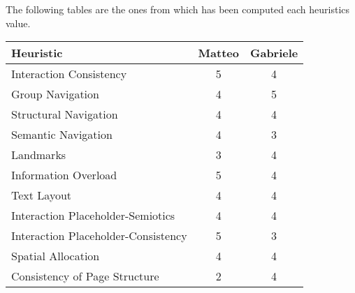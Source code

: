 The following tables are the ones from which has been computed each heuristics value.

\begin{table}[H]
  \begin{center}
    \begin{tabular}{|l|c|c|} %
          \hline

      \textbf{Heuristic} & \textbf{Matteo} & \textbf{Gabriele}\\
      
      \hline
      Interaction Consistency & 5 & 4\\
      \hline
      Group Navigation & 4 & 5\\
      \hline
      Structural Navigation & 4 & 4\\
      \hline
      Semantic Navigation & 4 & 3\\
      \hline
      Landmarks & 3 & 4\\
    \hline 
    \hline
    \hline

     Information Overload & 5 & 4\\
    \hline 
    \hline
    \hline
     Text Layout & 4 & 4\\
      \hline
      Interaction Placeholder-Semiotics & 4 & 4\\
      \hline
      Interaction Placeholder-Consistency & 5 & 3\\
      \hline
      Spatial Allocation & 4 & 4\\
      \hline
      Consistency of Page Structure & 2 & 4\\

\hline
    \end{tabular}
  \end{center}
\end{table}